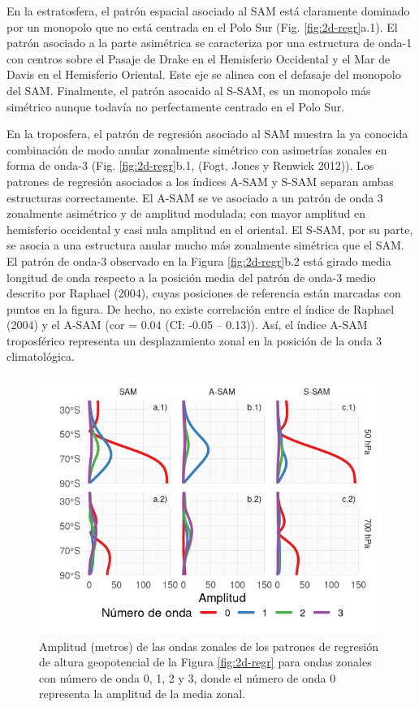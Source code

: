 \documentclass[12pt,oneside,a4paper]{reedthesis}
\begin{document}
En la estratosfera, el patrón espacial asociado al SAM está claramente dominado por un monopolo que no está centrada en el Polo Sur (Fig. \ref{fig:2d-regr}a.1).
El patrón asociado a la parte asimétrica se caracteriza por una estructura de onda-1 con centros sobre el Pasaje de Drake en el Hemisferio Occidental y el Mar de Davis en el Hemisferio Oriental.
Este eje se alinea con el defasaje del monopolo del SAM.
Finalmente, el patrón asocaido al S-SAM, es un monopolo más simétrico aunque todavía no perfectamente centrado en el Polo Sur.

En la troposfera, el patrón de regresión asociado al SAM muestra la ya conocida combinación de modo anular zonalmente simétrico con asimetrías zonales en forma de onda-3 (Fig. \ref{fig:2d-regr}b.1, (Fogt, Jones y Renwick 2012)).
Los patrones de regresión asociados a los índices A-SAM y S-SAM separan ambas estructuras correctamente.
El A-SAM se ve asociado a un patrón de onda 3 zonalmente asimétrico y de amplitud modulada; con mayor amplitud en hemisferio occidental y casi nula amplitud en el oriental.
El S-SAM, por su parte, se asocia a una estructura anular mucho más zonalmente simétrica que el SAM.
El patrón de onda-3 observado en la Figura \ref{fig:2d-regr}b.2 está girado media longitud de onda respecto a la posición media del patrón de onda-3 medio descrito por Raphael (2004), cuyas posiciones de referencia están marcadas con puntos en la figura.
De hecho, no existe correlación entre el índice de Raphael (2004) y el A-SAM (cor = 0.04 (CI: -0.05 -- 0.13)).
Así, el índice A-SAM troposférico representa un desplazamiento zonal en la posición de la onda 3 climatológica.



\begin{figure}

{\centering \includegraphics{figures/30-sam/wave-amplitude-1} 

}

\caption{Amplitud (metros) de las ondas zonales de los patrones de regresión de altura geopotencial de la Figura \ref{fig:2d-regr} para ondas zonales con número de onda 0, 1, 2 y 3, donde el número de onda 0 representa la amplitud de la media zonal.}\label{fig:wave-amplitude}
\end{figure}
\end{document}
